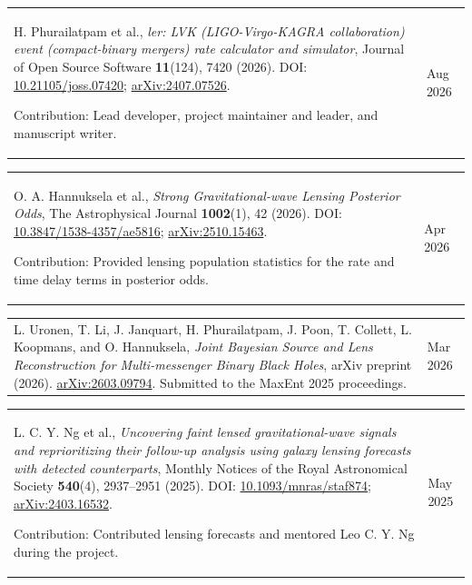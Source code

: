 \documentclass[margin,line]{res}
\begin{document}
\begin{resume}
\begin{tabular}{@{}p{\dimexpr\linewidth-0.62in-3\tabcolsep\relax}p{0.62in}}
    \raggedright H. Phurailatpam et al., \textit{ler: LVK (LIGO-Virgo-KAGRA collaboration) event (compact-binary mergers) rate calculator and simulator}, Journal of Open Source Software \textbf{11}(124), 7420 (2026). DOI: \href{https://doi.org/10.21105/joss.07420}{10.21105/joss.07420}; \href{https://arxiv.org/abs/2407.07526}{arXiv:2407.07526}.
    \par\smallskip Contribution: Lead developer, project maintainer and leader, and manuscript writer. & \raggedright Aug 2026
\end{tabular}



\begin{tabular}{@{}p{\dimexpr\linewidth-0.62in-3\tabcolsep\relax}p{0.62in}}
    \raggedright O. A. Hannuksela et al., \textit{Strong Gravitational-wave Lensing Posterior Odds}, The Astrophysical Journal \textbf{1002}(1), 42 (2026). DOI: \href{https://doi.org/10.3847/1538-4357/ae5816}{10.3847/1538-4357/ae5816}; \href{https://arxiv.org/abs/2510.15463}{arXiv:2510.15463}.
    \par\smallskip Contribution: Provided lensing population statistics for the rate and time delay terms in posterior odds. & \raggedright Apr 2026
\end{tabular}

\begin{tabular}{@{}p{\dimexpr\linewidth-0.62in-3\tabcolsep\relax}p{0.62in}}
    L. Uronen, T. Li, J. Janquart, H. Phurailatpam, J. Poon, T. Collett, L. Koopmans, and O. Hannuksela, \textit{Joint Bayesian Source and Lens Reconstruction for Multi-messenger Binary Black Holes}, arXiv preprint (2026). \href{https://arxiv.org/abs/2603.09794}{arXiv:2603.09794}. Submitted to the MaxEnt 2025 proceedings. & \raggedright Mar 2026
\end{tabular}

\begin{tabular}{@{}p{\dimexpr\linewidth-0.62in-3\tabcolsep\relax}p{0.62in}}
    L. C. Y. Ng et al., \textit{Uncovering faint lensed gravitational-wave signals and reprioritizing their follow-up analysis using galaxy lensing forecasts with detected counterparts}, Monthly Notices of the Royal Astronomical Society \textbf{540}(4), 2937--2951 (2025). DOI: \href{https://doi.org/10.1093/mnras/staf874}{10.1093/mnras/staf874}; \href{https://arxiv.org/abs/2403.16532}{arXiv:2403.16532}.
    \par\smallskip Contribution: Contributed lensing forecasts and mentored Leo C. Y. Ng during the project. & \raggedright May 2025
\end{tabular}


\end{resume}
\end{document}

